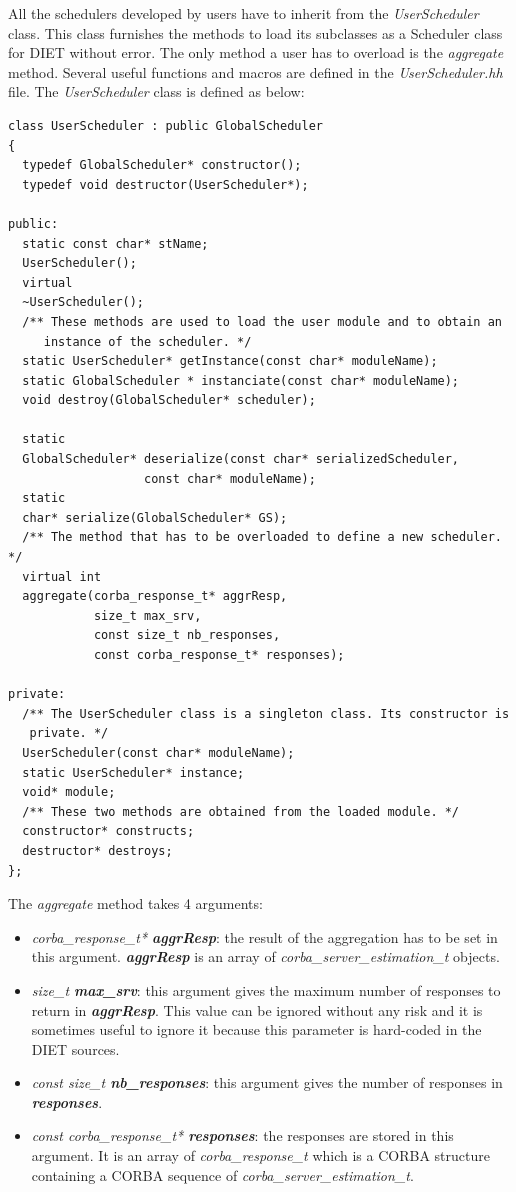 All the schedulers developed by users have to inherit from the
\textit{UserScheduler} class. This class furnishes the methods to load
its subclasses as a Scheduler class for DIET without error. The only method
a user has to overload is the \textit{aggregate} method. Several useful
functions and macros are defined in the \textit{UserScheduler.hh} file.
The \textit{UserScheduler} class is defined as below:
\begin{verbatim}
class UserScheduler : public GlobalScheduler
{
  typedef GlobalScheduler* constructor();
  typedef void destructor(UserScheduler*);

public:
  static const char* stName;
  UserScheduler();
  virtual
  ~UserScheduler();
  /** These methods are used to load the user module and to obtain an
     instance of the scheduler. */
  static UserScheduler* getInstance(const char* moduleName);
  static GlobalScheduler * instanciate(const char* moduleName);
  void destroy(GlobalScheduler* scheduler);

  static
  GlobalScheduler* deserialize(const char* serializedScheduler,
			       const char* moduleName);
  static
  char* serialize(GlobalScheduler* GS);
  /** The method that has to be overloaded to define a new scheduler. */
  virtual int
  aggregate(corba_response_t* aggrResp,
            size_t max_srv,
            const size_t nb_responses,
            const corba_response_t* responses);

private:
  /** The UserScheduler class is a singleton class. Its constructor is
   private. */
  UserScheduler(const char* moduleName);
  static UserScheduler* instance;
  void* module;
  /** These two methods are obtained from the loaded module. */
  constructor* constructs;
  destructor* destroys;
};
\end{verbatim}

\noindent The \textit{aggregate} method takes 4 arguments:
\begin{itemize}
  \item \textit{corba\_response\_t* \bf aggrResp}: the result of the aggregation
    has to be set in this argument. \textit{\bf aggrResp} is an array of
    \textit{corba\_server\_estimation\_t} objects. 
  \item \textit{size\_t \bf max\_srv}: this argument gives the maximum number
    of responses to return in \textit{\bf aggrResp}. This value can be ignored
    without any risk and it is sometimes useful to ignore it because this
    parameter is hard-coded in the DIET sources.
  \item \textit{const size\_t \bf nb\_responses}: this argument gives the number
    of responses in \textit{\bf responses}.
  \item \textit{const corba\_response\_t* \bf responses}: the responses are
    stored in this argument. It is an array of \textit{corba\_response\_t}
    which is a CORBA structure containing a CORBA sequence of
    \textit{corba\_server\_estimation\_t}.
\end{itemize}


